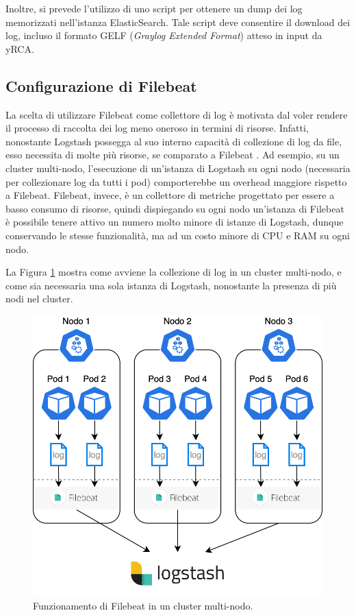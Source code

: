Inoltre, si prevede l'utilizzo di uno script per ottenere un dump dei log memorizzati nell'istanza ElasticSearch. Tale script deve consentire il download dei log, incluso il formato GELF (\textit{Graylog Extended Format}) atteso in input da yRCA.

\subsection{Configurazione di Filebeat}
La scelta di utilizzare Filebeat come collettore di log è motivata dal voler rendere il processo di raccolta dei log meno oneroso in termini di risorse. Infatti, nonostante Logstash possegga al suo interno capacità di collezione di log da file, esso necessita di molte più risorse, se comparato a Filebeat \cite{filebeat_resources}. Ad esempio, su un cluster multi-nodo, l'esecuzione di un'istanza di Logstash su ogni nodo (necessaria per collezionare log da tutti i pod) comporterebbe un overhead maggiore rispetto a Filebeat. Filebeat, invece, è un collettore di metriche progettato per essere a basso consumo di risorse, quindi dispiegando su ogni nodo un'istanza di Filebeat è possibile tenere attivo un numero molto minore di istanze di Logstash, dunque conservando le stesse funzionalità, ma ad un costo minore di CPU e RAM su ogni nodo.

La Figura \ref{fig:filebeat_multinode} mostra come avviene la collezione di log in  un cluster multi-nodo, e come sia necessaria una sola istanza di Logstash, nonostante la presenza di più nodi nel cluster.

\begin{figure}[h]
    \centering
    \includegraphics[width=0.75\linewidth]{immagini/capitolo3/filebeat.png}
    \caption{Funzionamento di Filebeat in un cluster multi-nodo.}
    \label{fig:filebeat_multinode}
\end{figure}

